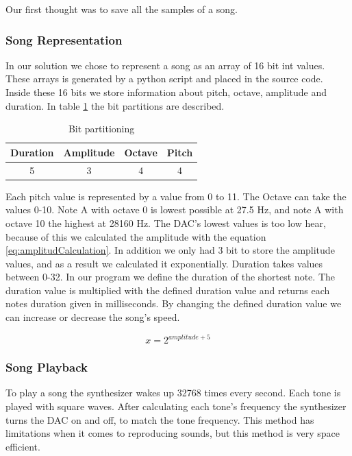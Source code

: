 Our first thought was to save all the samples of a song. 

\subsubsection{Song Representation}
In our solution we chose to represent a song as an array of 16 bit int values. These arrays is generated by a python script and placed in the source code. Inside these 16 bits we store information about pitch, octave, amplitude and duration. In table \ref{tab:bitFields} the bit partitions are described.

\begin{table}[H]
	\begin{center}
	\begin{tabular}{ |c|c|c|c| }
	  \hline
	  Duration & Amplitude & Octave & Pitch \\
	  \hline
	  5 & 3 & 4 & 4 \\
	  \hline

	\end{tabular}
	\caption{Bit partitioning}
	\label{tab:bitFields}
	\end{center}
\end{table}

Each pitch value is represented by a value from 0 to 11. The Octave can take the values 0-10. Note A with octave 0 is lowest possible at 27.5 Hz, and note A with octave 10 the highest at 28160 Hz. The DAC's lowest values is too low hear, because of this we calculated the amplitude with the equation \ref{eq:amplitudCalculation}. In addition we only had 3 bit to store the amplitude values, and as a result we calculated it exponentially. Duration takes values between 0-32. In our program we define the duration of the shortest note. The duration value is multiplied with the defined duration value and returns each notes duration given in milliseconds. By changing the defined duration value we can increase or decrease the song's speed.

\begin{equation}
  x = 2^{amplitude + 5}
  \label{eq:amplitudCalculation}
\end{equation}

\subsubsection{Song Playback}
To play a song the synthesizer wakes up 32768 times every second. Each tone is played with square waves. After calculating each tone's frequency the synthesizer turns the DAC on and off, to match the tone frequency. This method has limitations when it comes to reproducing sounds, but this method is very space efficient.


